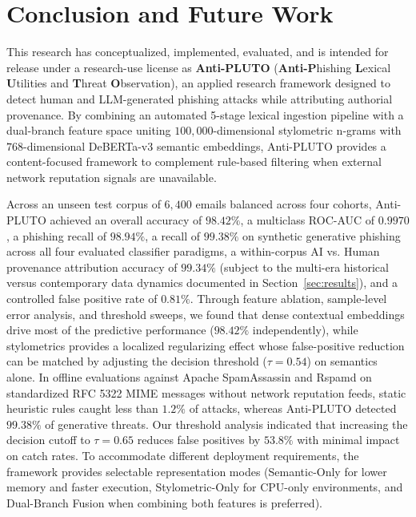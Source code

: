 \documentclass[journal]{IEEEtran}
\begin{document}
\section{Conclusion and Future Work}
\label{sec:conclusion}

This research has conceptualized, implemented, evaluated, and is intended for release under a research-use license as \textbf{Anti-PLUTO} (\textbf{Anti-P}hishing \textbf{L}exical \textbf{U}tilities and \textbf{T}hreat \textbf{O}bservation), an applied research framework designed to detect human and LLM-generated phishing attacks while attributing authorial provenance. By combining an automated 5-stage lexical ingestion pipeline with a dual-branch feature space uniting $100{,}000$-dimensional stylometric n-grams with $768$-dimensional DeBERTa-v3 semantic embeddings, Anti-PLUTO provides a content-focused framework to complement rule-based filtering when external network reputation signals are unavailable.

Across an unseen test corpus of $6{,}400$ emails balanced across four cohorts, Anti-PLUTO achieved an overall accuracy of $\mathbf{98.42\%}$, a multiclass ROC-AUC of $\mathbf{0.9970}$, a phishing recall of $\mathbf{98.94\%}$, a recall of $\mathbf{99.38\%}$ on synthetic generative phishing across all four evaluated classifier paradigms, a within-corpus AI vs. Human provenance attribution accuracy of $\mathbf{99.34\%}$ (subject to the multi-era historical versus contemporary data dynamics documented in Section~\ref{sec:results}), and a controlled false positive rate of $\mathbf{0.81\%}$. Through feature ablation, sample-level error analysis, and threshold sweeps, we found that dense contextual embeddings drive most of the predictive performance ($98.42\%$ independently), while stylometrics provides a localized regularizing effect whose false-positive reduction can be matched by adjusting the decision threshold ($\tau = 0.54$) on semantics alone. In offline evaluations against Apache SpamAssassin and Rspamd on standardized RFC 5322 MIME messages without network reputation feeds, static heuristic rules caught less than $1.2\%$ of attacks, whereas Anti-PLUTO detected $99.38\%$ of generative threats. Our threshold analysis indicated that increasing the decision cutoff to $\tau = 0.65$ reduces false positives by $53.8\%$ with minimal impact on catch rates. To accommodate different deployment requirements, the framework provides selectable representation modes (Semantic-Only for lower memory and faster execution, Stylometric-Only for CPU-only environments, and Dual-Branch Fusion when combining both features is preferred).
\end{document}
